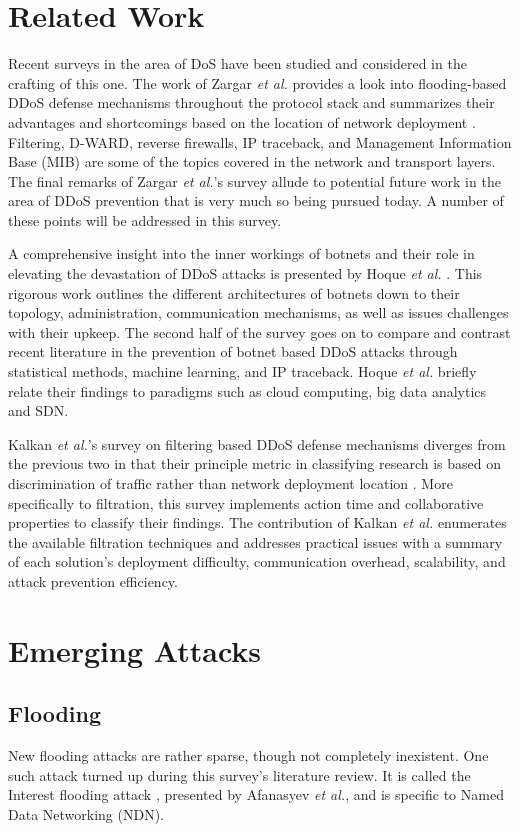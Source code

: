 \documentclass[conference]{IEEEtran}
\begin{document}
\section{Related Work}
Recent surveys in the area of DoS have been studied and considered in the crafting of this one. The work of Zargar \textit{et al.} provides a look into flooding-based DDoS defense mechanisms throughout the protocol stack and summarizes their advantages and shortcomings based on the location of network deployment \cite{Zargar:DDOSFlood}. Filtering,  D-WARD, reverse firewalls, IP traceback, and Management Information Base (MIB) are some of the topics covered in the network and transport layers. The final remarks of Zargar \textit{et al.}'s survey allude to potential future work in the area of DDoS prevention that is very much so being pursued today. A number of these points will be addressed in this survey.

A comprehensive insight into the inner workings of botnets and their role in elevating the devastation of DDoS attacks is presented by Hoque \textit{et al.} \cite{Botnet:Hoque}. This rigorous work outlines the different architectures of botnets down to their topology, administration, communication mechanisms, as well as issues challenges with their upkeep. The second half of the survey goes on to compare and contrast recent literature in the prevention of botnet based DDoS attacks through statistical methods, machine learning, and IP traceback. Hoque \textit{et al.} briefly relate their findings to paradigms such as cloud computing, big data analytics and SDN.

Kalkan \textit{et al.}'s survey on filtering based DDoS defense mechanisms diverges from the previous two in that their principle metric in classifying research is based on discrimination of traffic rather than network deployment location \cite{Filtration:Kalkan}. More specifically to filtration, this survey implements action time and collaborative properties to classify their findings. The contribution of Kalkan \textit{et al.} enumerates the available filtration techniques and addresses practical issues with a summary of each solution's deployment difficulty, communication overhead, scalability, and attack prevention efficiency. 

\section{Emerging Attacks}
\subsection{Flooding}
New flooding attacks are rather sparse, though not completely inexistent. One such attack turned up during this survey's literature review. It is called the Interest flooding attack \cite{Afanasyev:NDN}, presented by Afanasyev \textit{et al.}, and is specific to Named Data Networking (NDN).
\end{document}
